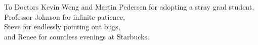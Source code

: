 
\begin{dedication}
\null\vfil
{\large
\begin{center}
To Doctors Kevin Weng and Martin Pedersen for adopting a stray grad student,\\\vspace{12pt}
Professor Johnson for infinite patience,\\\vspace{12pt}
Steve for endlessly pointing out bugs,\\\vspace{12pt}
and Renee for countless evenings at Starbucks.
\end{center}}
\vfil\null
\end{dedication}
